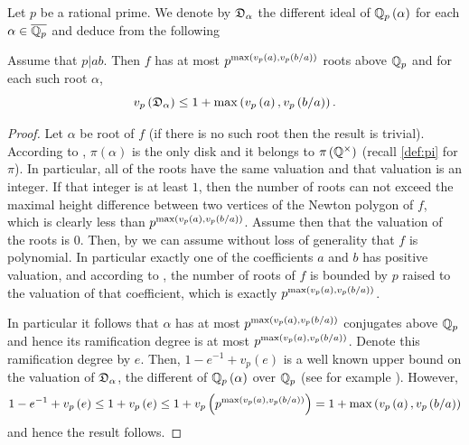 \documentclass[../main.tex]{subfiles}
\begin{document}
  Let $p$ be a rational prime.
  We denote by $\mathfrak{D}_\alpha$ the different ideal of $\mathbb{Q}_p\left( \alpha \right)$ for each $\alpha \in \overline{\mathbb{Q}_p}$ and deduce from  the following

  \begin{corollary}\label{cor:ex_bound}
    Assume that $p| ab$.
    Then $f$ has at most $p^{\max\left( v_p\left( a \right), v_p\left( b / a \right) \right)}$ \ex roots above $\mathbb{Q}_p$ and for each such root $\alpha$, 
    \[
      v_p\left( \mathfrak{D}_\alpha \right) \leq 1 + \max\left( v_p\left( a \right), v_p\left( b / a \right) \right).
    \]
  \end{corollary}
  \begin{proof}
    Let $\alpha$ be \anex root of $f$ (if there is no such root then the result is trivial).
    According to , $\pi\left( \alpha \right)$ is the only \ex disk and it belongs to $\pi\left( \mathbb{Q}^\times \right)$ (recall \cref{def:pi} for $\pi$).
    In particular, all of the \ex roots have the same valuation and that valuation is an integer.
    If that integer is at least $1$, then the number of \ex roots can not exceed the maximal height difference between two vertices of the Newton polygon of $f$, which is clearly less than $p^{\max\left( v_p\left( a \right), v_p\left( b / a \right) \right)}$.
    Assume then that the valuation of the \ex roots is $0$.
    Then, by  we can assume without loss of generality that $f$ is \aredex polynomial.
    In particular exactly one of the coefficients $a$ and $b$ has positive valuation, and according to , the number of \ex roots of $f$ is bounded by $p$ raised to the valuation of that coefficient, which is exactly $p^{\max\left( v_p\left( a \right), v_p\left( b / a \right) \right)}$.

    In particular it follows that $\alpha$ has at most $p^{\max\left( v_p\left( a \right), v_p\left( b / a \right) \right)}$ conjugates above $\mathbb{Q}_p$ and hence its ramification degree is at most $p^{\max\left( v_p\left( a \right), v_p\left( b / a \right) \right)}$.
    Denote this ramification degree by $e$.
    Then, $1-e^{-1} + v_p\left( e \right)$ is a well known upper bound on the valuation of $\mathfrak{D}_\alpha$, the different of $\mathbb{Q}_p\left( \alpha \right)$ over $\mathbb{Q}_p$ (see for example \cite[Remark 1 to Proposition 13 of Chapter. III \S 7]{SerreLocalFields}).
    However, $$1 - e^{-1} + v_p\left( e \right) \leq 1 + v_p\left( e \right) \leq 1 + v_p\left( p^{\max\left( v_p\left( a \right), v_p\left( b / a \right) \right)} \right) = 1 + \max\left( v_p\left( a \right), v_p\left( b / a \right) \right)$$ and hence the result follows.
  \end{proof}
\end{document}
